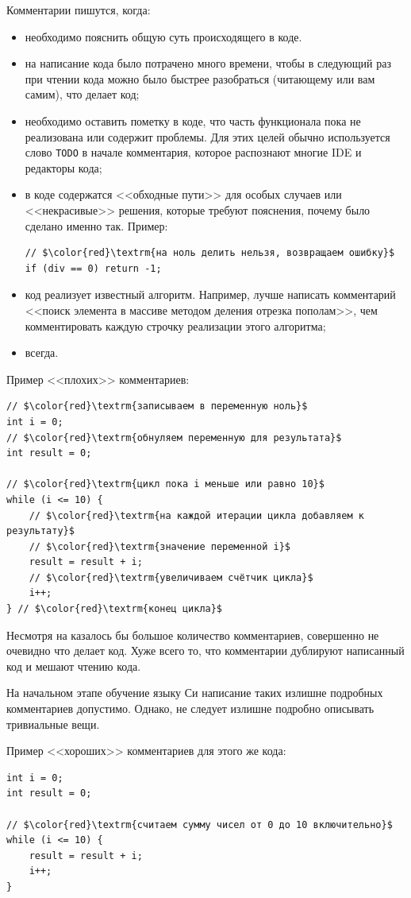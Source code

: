 \documentclass[myc.tex]{subfiles}
\begin{document}
Комментарии пишутся, когда:
\begin{itemize}
\item необходимо пояснить общую суть происходящего в коде.
\item на написание кода было потрачено много времени, чтобы в следующий раз при чтении кода можно было быстрее разобраться (читающему или вам самим), что делает код;
\item необходимо оставить пометку в коде, что часть функционала пока не реализована или содержит проблемы. Для этих целей обычно используется слово \texttt{TODO} в начале комментария, которое распознают многие IDE и редакторы кода;
\item в коде содержатся <<обходные пути>> для особых случаев или <<некрасивые>> решения, которые требуют пояснения, почему было сделано именно так. Пример:
\begin{lstlisting}
// $\color{red}\textrm{на ноль делить нельзя, возвращаем ошибку}$
if (div == 0) return -1;
\end{lstlisting}
\item код реализует известный алгоритм. Например, лучше написать комментарий <<поиск элемента в массиве методом деления отрезка пополам>>, чем комментировать каждую строчку реализации этого алгоритма;
\item всегда.
\end{itemize}

Пример <<плохих>> комментариев:
\begin{lstlisting}
// $\color{red}\textrm{записываем в переменную ноль}$
int i = 0;
// $\color{red}\textrm{обнуляем переменную для результата}$
int result = 0;

// $\color{red}\textrm{цикл пока i меньше или равно 10}$
while (i <= 10) {
    // $\color{red}\textrm{на каждой итерации цикла добавляем к результату}$
    // $\color{red}\textrm{значение переменной i}$
    result = result + i;
    // $\color{red}\textrm{увеличиваем счётчик цикла}$
    i++;
} // $\color{red}\textrm{конец цикла}$
\end{lstlisting}

Несмотря на казалось бы большое количество комментариев, совершенно не очевидно что делает код. Хуже всего то, что комментарии дублируют написанный код и мешают чтению кода.

На начальном этапе обучение языку Си написание таких излишне подробных комментариев допустимо. Однако, не следует излишне подробно описывать тривиальные вещи.

Пример <<хороших>> комментариев для этого же кода:
\begin{lstlisting}
int i = 0;
int result = 0;

// $\color{red}\textrm{считаем сумму чисел от 0 до 10 включительно}$
while (i <= 10) {
    result = result + i;
    i++;
}
\end{lstlisting}
\end{document}
